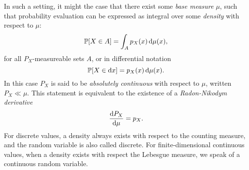 In such a setting, it might the case that there exist some \emph{base measure} \(\mu\), such that
probability evaluation can be expressed as integral over some \emph{density} with respect to \(\mu\):
\begin{equation}
  \label{eq:measure-integral}
  \Prob{X \in A} = \int_{A} \prob[X]{x} \dif\mu(x),
\end{equation}
for all \(P_X\)-measureable sets \(A\), or in differential notation
\begin{equation}
  \label{eq:measure-differential}
  \Prob{X \in \dif x} = \prob[X]{x} \dif\mu(x).
\end{equation}
In this case \(P_X\) is said to be \emph{absolutely continuous} with respect to \(\mu\), written
\(P_X \ll \mu\).  This statement is equivalent to the existence of a \emph{Radon-Nikodym derivative}
\begin{equation}
  \label{eq:radon-nikodym}
  \frac{\dif P_{X}}{\dif \mu} = p_{X}.
\end{equation}
For discrete values, a density always exists with respect to the counting measure, and the random
variable is also called discrete.  For finite-dimensional continuous values, when a density exists
with respect the Lebesgue measure, we speak of a continuous random variable. 





